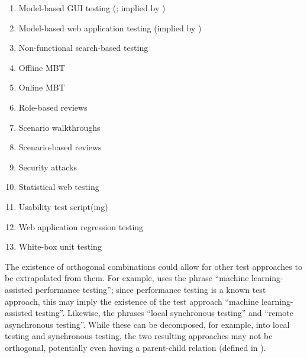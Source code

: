 \begin{enumerate}
        \item Model-based GUI testing (\citealp[Tab.~1]{DoğanEtAl2014}; implied
              by \citealp[p.~356]{SakamotoEtAl2013})
        \item Model-based web application testing (implied by
              \citealp[p.~356]{SakamotoEtAl2013})
        \item Non-functional search-based testing \citep[Tab.~1]{DoğanEtAl2014}
        \item Offline MBT \citepISTQB{}
        \item Online MBT \citepISTQB{}
        \item Role-based reviews \citepISTQB{}
        \item Scenario walkthroughs \citep[Fig.~4]{Gerrard2000a}
        \item Scenario-based reviews \citepISTQB{}
        \item Security attacks \citepISTQB{}
        \item Statistical web testing \citep[p.~185]{DoğanEtAl2014}
        \item Usability test script(ing) \citepISTQB{}
        \item Web application regression testing \cite[Tab.~21]{DoğanEtAl2014}
        \item White-box unit testing \citep[pp.~345-346]{SakamotoEtAl2013}
    \end{enumerate}

    The existence of orthogonal combinations could allow for other test
    approaches to be extrapolated from them. For example, \citet{Moghadam2019}
    uses the phrase ``machine learning-assisted performance testing''; since
    performance testing is a known test approach, this may imply the existence
    of the test approach ``machine learning-assisted testing''. Likewise,
    \citet{JardEtAl1999}  the phrases ``local synchronous
    testing'' and ``remote asynchronous testing''. While these can be
    decomposed, for example, into local testing and synchronous testing,
    the two resulting approaches may not be orthogonal, potentially even having
    a parent-child relation (defined in ).

\fi